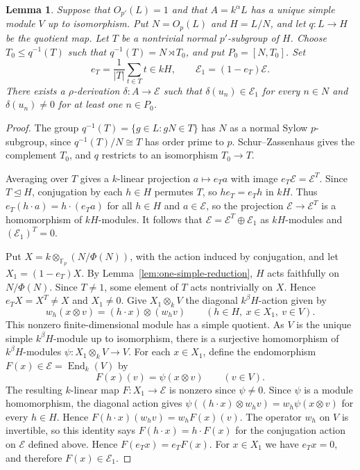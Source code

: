 \documentclass[11pt,a4paper]{article}
\newtheorem{lemma}[theorem]{Lemma}
\theoremstyle{definition}
\theoremstyle{remark}
\numberwithin{equation}{section}
\newcommand{\Fp}{\mathbb{F}_p}
\DeclareMathOperator{\End}{End}
\begin{document}
	\begin{lemma}\label{lem:target-derivation}
		Suppose that $O_{p'}(L)=1$ and that $A=k^\alpha L$ has a unique simple
		module $V$ up to isomorphism. Put $N=O_p(L)$ and $H=L/N$, and let
		$q:L\to H$ be the quotient map. Let $T$ be a nontrivial normal
		$p'$-subgroup of $H$. Choose $T_0\leq q^{-1}(T)$ such that
		$q^{-1}(T)=N\rtimes T_0$, and put $P_0=[N,T_0]$. Set
		\[
		e_T=\frac{1}{|T|}\sum_{t\in T}t\in kH,\qquad \mathcal{E}_1=(1-e_T)\mathcal{E}.
		\]
		There exists a $\rho$-derivation $\delta:A\to \mathcal{E}$ such that
		$\delta(u_n)\in\mathcal{E}_1$ for every $n\in N$ and
		$\delta(u_n)\ne0$ for at least one $n\in P_0$.
	\end{lemma}
	
	\begin{proof}
		The group $q^{-1}(T)=\{g\in L:gN\in T\}$ has $N$ as a normal Sylow
		$p$-subgroup, since $q^{-1}(T)/N\cong T$ has order prime to $p$.
		Schur--Zassenhaus gives the complement $T_0$, and $q$ restricts to an
		isomorphism $T_0\to T$.
		
		Averaging over $T$ gives a $k$-linear projection $a\mapsto e_Ta$
		with image $e_T\mathcal{E}=\mathcal{E}^T$. Since $T\unlhd H$,
		conjugation by each $h\in H$ permutes $T$, so $he_T=e_Th$ in $kH$.
		Thus $e_T(h\cdot a)=h\cdot(e_Ta)$ for all $h\in H$ and
		$a\in\mathcal{E}$, so the projection $\mathcal{E}\to\mathcal{E}^T$
		is a homomorphism of $kH$-modules.
		It follows that $\mathcal{E}=\mathcal{E}^T\oplus\mathcal{E}_1$ as $kH$-modules
		and $(\mathcal{E}_1)^T=0$.
		
		Put $X=k\otimes_{\Fp}(N/\Phi(N))$, with the action induced by
		conjugation, and let $X_1=(1-e_T)X$. By Lemma~\ref{lem:one-simple-reduction},
		$H$ acts faithfully on $N/\Phi(N)$. Since $T\ne1$, some element of $T$
		acts nontrivially on $X$. Hence $e_TX=X^T\ne X$ and $X_1\ne0$.
		Give $X_1\otimes_k V$ the diagonal $k^\beta H$-action
		\cite[Proposition~1.6.10]{Linckelmann2018a} given by
		\[
		w_h(x\otimes v)=(h\cdot x)\otimes(w_hv)
		\qquad(h\in H,\ x\in X_1,\ v\in V).
		\]
		This nonzero finite-dimensional module
		has a simple quotient. As $V$ is the unique simple $k^\beta H$-module
		up to isomorphism, there is a surjective homomorphism of $k^\beta H$-modules
		$\psi:X_1\otimes_k V\to V$. For each $x\in X_1$, define the
		endomorphism $F(x)\in\mathcal{E}=\End_k(V)$ by
		\[
		F(x)(v)=\psi(x\otimes v)\qquad(v\in V).
		\]
		The resulting $k$-linear map $F:X_1\to\mathcal{E}$ is nonzero since $\psi\ne0$.
		Since $\psi$ is a module homomorphism, the diagonal action gives
		$\psi((h\cdot x)\otimes w_hv)=w_h\psi(x\otimes v)$ for every $h\in H$.
		Hence $F(h\cdot x)(w_hv)=w_hF(x)(v)$. The operator $w_h$ on $V$ is
		invertible, so this identity says $F(h\cdot x)=h\cdot F(x)$ for the
		conjugation action on $\mathcal{E}$ defined above. Hence $F(e_Tx)=e_TF(x)$.
		For $x\in X_1$ we have $e_Tx=0$, and therefore $F(x)\in\mathcal{E}_1$.
		

\end{proof}
\end{document}
